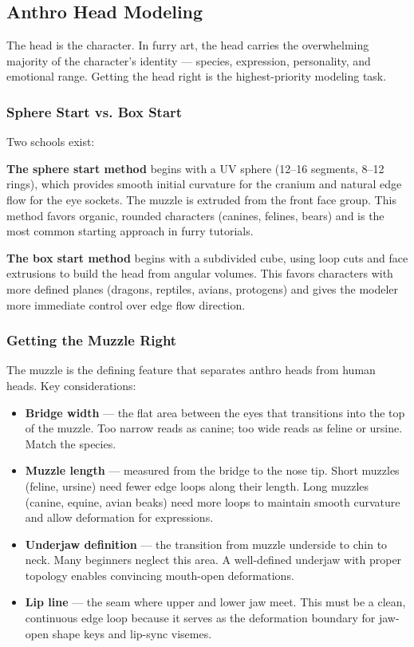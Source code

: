 \subsection{Anthro Head Modeling}
\label{subsec:head-modeling}

The head is the character. In furry art, the head carries the overwhelming majority of the character's identity --- species, expression, personality, and emotional range. Getting the head right is the highest-priority modeling task.

\subsubsection{Sphere Start vs. Box Start}

Two schools exist:

\textbf{The sphere start method} begins with a UV sphere (12--16 segments, 8--12 rings), which provides smooth initial curvature for the cranium and natural edge flow for the eye sockets. The muzzle is extruded from the front face group. This method favors organic, rounded characters (canines, felines, bears) and is the most common starting approach in furry tutorials.

\textbf{The box start method} begins with a subdivided cube, using loop cuts and face extrusions to build the head from angular volumes. This favors characters with more defined planes (dragons, reptiles, avians, protogens) and gives the modeler more immediate control over edge flow direction.

\subsubsection{Getting the Muzzle Right}

The muzzle is the defining feature that separates anthro heads from human heads. Key considerations:

\begin{itemize}[leftmargin=2em]
  \item \textbf{Bridge width} --- the flat area between the eyes that transitions into the top of the muzzle. Too narrow reads as canine; too wide reads as feline or ursine. Match the species.

  \item \textbf{Muzzle length} --- measured from the bridge to the nose tip. Short muzzles (feline, ursine) need fewer edge loops along their length. Long muzzles (canine, equine, avian beaks) need more loops to maintain smooth curvature and allow deformation for expressions.

  \item \textbf{Underjaw definition} --- the transition from muzzle underside to chin to neck. Many beginners neglect this area. A well-defined underjaw with proper topology enables convincing mouth-open deformations.

  \item \textbf{Lip line} --- the seam where upper and lower jaw meet. This must be a clean, continuous edge loop because it serves as the deformation boundary for jaw-open shape keys and lip-sync visemes.
\end{itemize}


